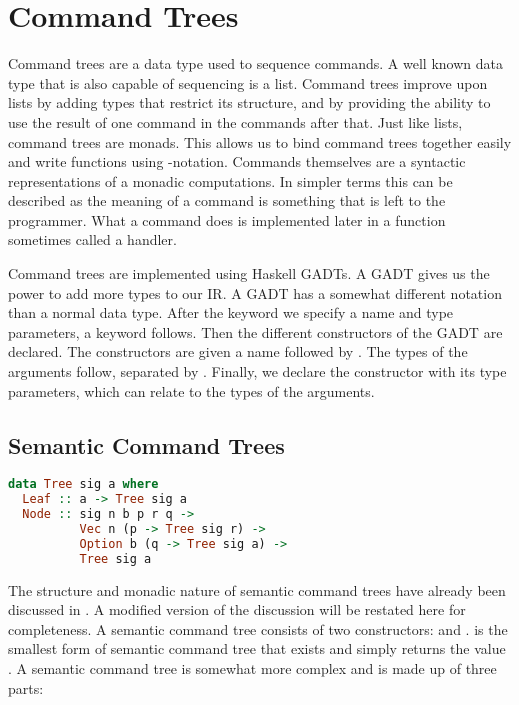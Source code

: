 \section{\label{section:commandtree}Command Trees}
Command trees are a data type used to sequence commands. A well known data type that is also capable of sequencing is a list. Command trees improve upon lists by adding types that restrict its structure, and by providing the ability to use the result of one command in the commands after that. Just like lists, command trees are monads. This allows us to bind command trees together easily and write functions using -notation. Commands themselves are a syntactic representations of a monadic computations. In simpler terms this can be described as the meaning of a command is something that is left to the programmer. What a command does is implemented later in a function sometimes called a handler.

Command trees are implemented using Haskell \acp{GADT}. A \ac{GADT} gives us the power to add more types to our \ac{IR}. A \ac{GADT} has a somewhat different notation than a normal data type. After the  keyword we specify a name and type parameters, a  keyword follows. Then the different constructors of the \ac{GADT} are declared. The constructors are given a name followed by \icode{::}. The types of the arguments follow, separated by \icode{->}. Finally, we declare the constructor with its type parameters, which can relate to the types of the arguments.

\subsection{\label{subsection:semantree}Semantic Command Trees}
\begin{lstlisting}[language=Haskell]
data Tree sig a where
  Leaf :: a -> Tree sig a
  Node :: sig n b p r q ->
          Vec n (p -> Tree sig r) ->
          Option b (q -> Tree sig a) ->
          Tree sig a
\end{lstlisting}

The structure and monadic nature of semantic command trees have already been discussed in . A modified version of the discussion will be restated here for completeness. A semantic command tree consists of two constructors:  and .  is the smallest form of semantic command tree that exists and simply returns the value . A  semantic command tree is somewhat more complex and is made up of three parts:

